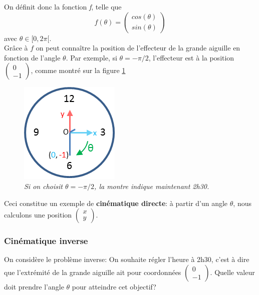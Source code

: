 \documentclass{article}
\begin{document}
On d\'efinit donc la fonction \textit{f}, telle que
 \begin{displaymath}  
f(\theta) =  \begin{pmatrix}
cos(\theta) \\
sin(\theta)
\end{pmatrix}
 \end{displaymath}
avec \begin{math} \theta \in [0, 2\pi[ \end{math}. \\

Gr\^ace \`a $f$ on peut conna\^itre la position de l'effecteur de la grande aiguille en fonction de l'angle $\theta$. Par exemple, si $\theta = -\pi / 2$,
l'effecteur est \`a la position $\begin{pmatrix}
0 \\
-1
\end{pmatrix}$, comme montr\'e sur la figure \ref{2h30}

\begin{figure}[htb]
  \centering
    \includegraphics[]{watchrotcart}
  \caption{
          \textit{Si on choisit $\theta = -\pi / 2$, la montre indique maintenant 2h30.}}
		   \label{2h30}
\end{figure}

Ceci constitue un exemple de \textbf{cin\'ematique directe}: \`a partir d'un angle $\theta$, nous calculons une position
$\begin{pmatrix} x \\ y \end{pmatrix}$.

\subsubsection*{Cin\'ematique inverse}
On consid\`ere le probl\`eme inverse:
On souhaite r\'egler l'heure \`a 2h30,  c'est \`a dire que l'extr\'emit\'e de la grande aiguille ait pour coordonn\'ees $\begin{pmatrix} 0 \\ -1 \end{pmatrix}$.
Quelle valeur doit prendre l'angle $\theta$ pour atteindre cet objectif? \\
\end{document}
